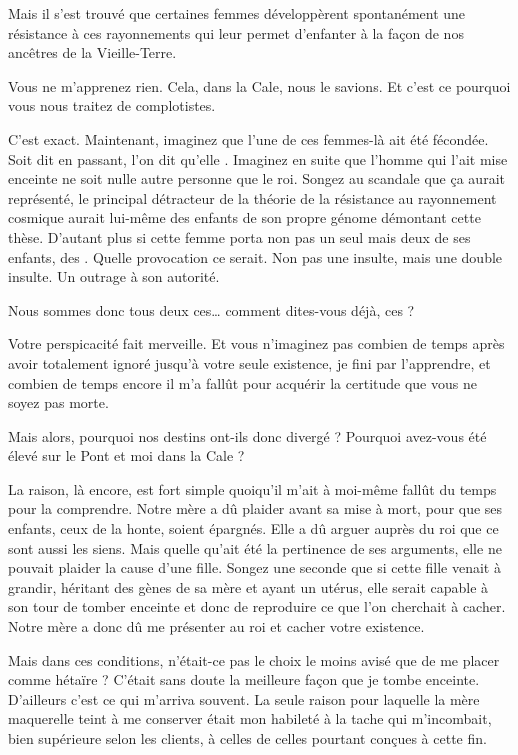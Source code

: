 \begin{drama}
   Mais il s’est trouvé que certaines femmes développèrent spontanément une résistance à ces rayonnements qui leur permet d’enfanter à la façon de nos ancêtres de la Vieille-Terre.

   \elaspeaks Vous ne m’apprenez rien. Cela, dans la Cale, nous le savions. Et c’est ce pourquoi vous nous traitez de complotistes.

   \elenaspeaks C’est exact. Maintenant, imaginez que l’une de ces femmes-là ait été fécondée. Soit dit en passant, l’on dit qu’elle . Imaginez en suite que l’homme qui l’ait mise enceinte ne soit nulle autre personne que le roi. Songez au scandale que ça aurait représenté, le principal détracteur de la théorie de la résistance au rayonnement cosmique aurait lui-même des enfants de son propre génome démontant cette thèse. D’autant plus si cette femme porta non pas un seul mais deux de ses enfants, des . Quelle provocation ce serait. Non pas une insulte, mais une double insulte. Un outrage à son autorité.

   \elaspeaks Nous sommes donc tous deux ces… comment dites-vous déjà, ces  ?

   \elenaspeaks Votre perspicacité fait merveille. Et vous n’imaginez pas combien de temps après avoir totalement ignoré jusqu’à votre seule existence, je fini par l’apprendre, et combien de temps encore il m’a fallût pour acquérir la certitude que vous ne soyez pas morte.

   \elaspeaks Mais alors, pourquoi nos destins ont-ils donc divergé ? Pourquoi avez-vous été élevé sur le Pont et moi dans la Cale ?

   \elenaspeaks La raison, là encore, est fort simple quoiqu’il m’ait à moi-même fallût du temps pour la comprendre. Notre mère a dû plaider avant sa mise à mort, pour que ses enfants, ceux de la honte, soient épargnés. Elle a dû arguer auprès du roi que ce sont aussi les siens. Mais quelle qu’ait été la pertinence de ses arguments, elle ne pouvait plaider la cause d’une fille. Songez une seconde que si cette fille venait à grandir, héritant des gènes de sa mère et ayant un utérus, elle serait capable à son tour de tomber enceinte et donc de reproduire ce que l’on cherchait à cacher. Notre mère a donc dû me présenter au roi et cacher votre existence.

   \elaspeaks Mais dans ces conditions, n’était-ce pas le choix le moins avisé que de me placer comme hétaïre ? C’était sans doute la meilleure façon que je tombe enceinte. D’ailleurs c’est ce qui m’arriva souvent. La seule raison pour laquelle la mère maquerelle teint à me conserver était mon habileté à la tache qui m’incombait, bien supérieure selon les clients, à celles de celles pourtant conçues à cette fin.


\end{drama}
